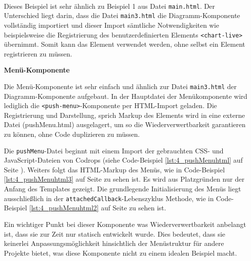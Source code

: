 \begin{enumerate}






 \hfill \\
Dieses Beispiel ist sehr ähnlich zu Beispiel 1 aus Datei \lstinline|main.html|. Der Unterschied liegt darin, dass die Datei \lstinline|main3.html| die Diagramm-Komponente vollständig importiert und dieser Import sämtliche Notwendigkeiten wie beispielsweise die Registrierung des benutzerdefinierten Elements \lstinline|<chart-live>| übernimmt. Somit kann das Element verwendet werden, ohne selbst ein Element registrieren zu müssen.
\end{enumerate}

\textbf{Menü-Komponente}

Die Menü-Komponente ist sehr einfach und ähnlich zur Datei \lstinline|main3.html| der Diagramm-Komponente aufgebaut. In der Hauptdatei der Menükomponente wird lediglich die \lstinline|<push-menu>|-Komponente per HTML-Import geladen. Die Registrierung und Darstellung, sprich Markup des Elements wird in eine externe Datei (pushMenu.html) ausgelagert, um so die Wiederverwertbarkeit garantieren zu können, ohne Code duplizieren zu müssen.

Die \lstinline|pushMenu|-Datei beginnt mit einem Import der gebrauchten CSS- und JavaScript-Dateien von Codrops (siehe Code-Beispiel \ref{lst:4_pushMenuhtml} auf Seite \pageref{lst:4_pushMenuhtml}). Weiters folgt das HTML-Markup des Menüs, wie in Code-Beispiel \ref{lst:4_pushMenuhtml3} auf Seite \pageref{lst:4_pushMenuhtml3} zu sehen ist. Es wird aus Platzgründen nur der Anfang des Templates gezeigt. Die grundlegende Initialisierung des Menüs liegt ausschließlich in der \lstinline|attachedCallback|-Lebenszyklus Methode, wie in Code-Beispiel \ref{lst:4_pushMenuhtml2} auf Seite \pageref{lst:4_pushMenuhtml2} zu sehen ist.

Ein wichtiger Punkt bei dieser Komponente was Wiederverwertbarkeit anbelangt ist, dass sie zur Zeit nur statisch entwickelt wurde. Dies bedeutet, dass sie keinerlei Anpassungsmöglichkeit hinsichtlich der Menüstruktur für andere Projekte bietet, was diese Komponente nicht zu einem idealen Beispiel macht.

